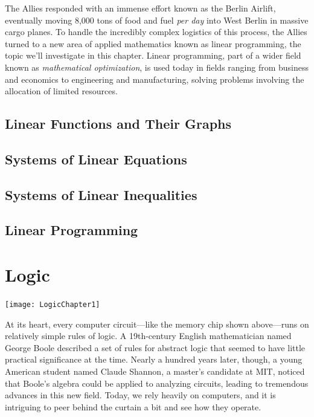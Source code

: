 \documentclass[9pt,letter,twoside,openright]{memoir}
\begin{document}
The Allies responded with an immense effort known as the Berlin Airlift, eventually moving 8,000 tons of food and fuel \textit{per day} into West Berlin in massive cargo planes.  To handle the incredibly complex logistics of this process, the Allies turned to a new area of applied mathematics known as linear programming, the topic we'll investigate in this chapter.  Linear programming, part of a wider field known as \textit{mathematical optimization}, is used today in fields ranging from business and economics to engineering and manufacturing, solving problems involving the allocation of limited resources.
\vfill
\pagebreak

\section{Linear Functions and Their Graphs}


\section{Systems of Linear Equations}


\section{Systems of Linear Inequalities}


\section{Linear Programming}


\chapter{Logic}
\begin{center}\texttt{[image: LogicChapter1]}\end{center}

At its heart, every computer circuit---like the memory chip shown above---runs on relatively simple rules of logic.  A 19th-century English mathematician named George Boole described a set of rules for abstract logic that seemed to have little practical significance at the time.  Nearly a hundred years later, though, a young American student named Claude Shannon, a master's candidate at MIT, noticed that Boole's algebra could be applied to analyzing circuits, leading to tremendous advances in this new field.  Today, we rely heavily on computers, and it is intriguing to peer behind the curtain a bit and see how they operate.
\end{document}
